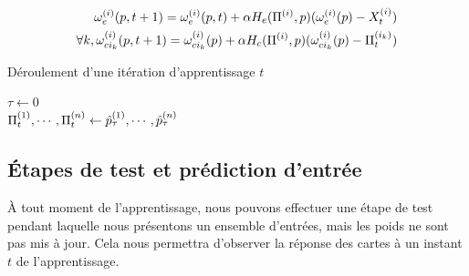 \documentclass[../main]{subfiles}
\begin{document}
\begin{align}\label{eq:update_general}
 \omega_{e}^{({i})}(p,t+1) = \omega_{e}^{({i})}(p,t) + \alpha H_{e}(\Pi^{({i})}, p)(\omega_{e}^{({i})}(p) - X_t^{({i})}) \\
\forall k, \omega_{ci_k}^{({i})}(p,t+1) = \omega_{ci_k}^{({i})}(p) + \alpha H_{c}(\Pi^{({i})},p)(\omega_{ci_k}^{({i})}(p) - \Pi^{({i_k})}_t)
\end{align}


\begin{algorithm}\label{algo:cxsom}
\caption{Déroulement d'une itération d'apprentissage $t$}
\SetAlgoLined
  $\tau \leftarrow 0$\\
  $\Pi^{({1})}_t, \cdots, \Pi^{({n})}_t \leftarrow \hat{p}^{({1})}_\tau, \cdots , \hat{p}^{({n})}_\tau$\\
 \end{algorithm}
 
\subsection{\'Etapes de test et prédiction d'entrée}\label{sec:modele_test}

\`A tout moment de l'apprentissage, nous pouvons effectuer une étape de test pendant laquelle nous présentons un ensemble d'entrées, mais les poids ne sont pas mis à jour. Cela nous permettra d'observer la réponse des cartes à un instant $t$ de l'apprentissage.
\end{document}
